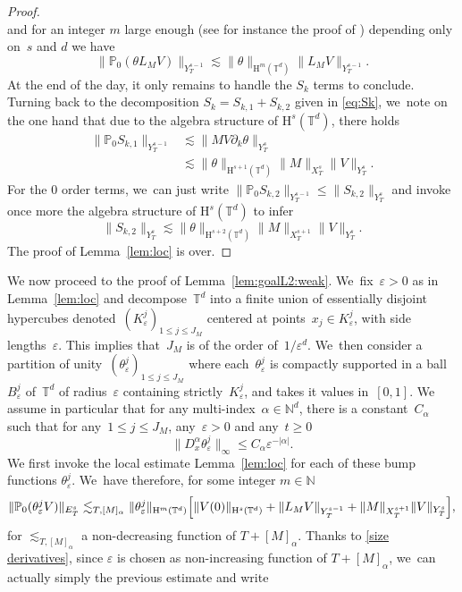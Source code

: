 \documentclass[JEP,XML,SOM,Unicode,published]{cedram}
\theoremstyle{definition}
\newcommand\N{\mathbb{N}}
\newcommand\T{\mathbb{T}}
\renewcommand\H{\mathrm{H}}
\let\ep\varepsilon
\begin{document}
\begin{proof}
\[\]
and for an integer $m$ large enough (see for instance the proof of \cite[Th.\,1.62]{BCD}) depending only on~$s$ and $d$ we have
\[
\|\mathbb{P}_0(\theta L_M V)\|_{Y_T^{s-1}} \lesssim \|\theta\|_{\H^{m}(\T^d)} \|L_M V\|_{Y_T^{s-1}}.
\]
At the end of the day, it only remains to handle the $S_k$ terms to conclude. Turning back to the decomposition $S_k = S_{k,1}+S_{k,2}$ given in \eqref{eq:Sk}, we~note on the one hand that due to the algebra structure of $\H^s(\T^d)$, there holds
\begin{align*}
\|\mathbb{P}_0S_{k,1}\|_{Y_T^{s-1}} &\lesssim \|MV \partial_k\theta\|_{Y_T^s} \\
&\lesssim \|\theta\|_{\H^{s+1}(\T^d)} \|M\|_{X_T^{s}} \|V\|_{Y_T^s}.
\end{align*}
For the $0$ order terms, we~can just write $\|\mathbb{P}_0S_{k,2}\|_{Y_T^{s-1}} \leq \|S_{k,2}\|_{Y_T^s}$ and invoke once more the algebra structure of $\H^s(\T^d)$ to infer
\[
\|S_{k,2}\|_{Y_T^s} \lesssim \|\theta\|_{\H^{s+2}(\T^d)}\|M\|_{X_T^{s+1}} \|V\|_{Y_T^s}.
\]
The proof of Lemma~\ref{lem:loc} is over.
\end{proof}
We now proceed to the proof of Lemma~\ref{lem:goalL2:weak}. We~fix~$\ep>0$ as in Lemma~\ref{lem:loc} and decompose~$\T^d $ into a finite union of essentially disjoint hypercubes denoted~$(K^{j}_\ep)_{1 \leq j \leq J_M} $ centered at points~$ x_j \in K^j_\ep $, with side lengths~$\ep$. This implies that~$J_M$ is of the order of~$1/\ep^d$. We~then consider a partition of unity~$(\theta^{j}_\ep)_{1 \leq j \leq J_M} $ where each~$\theta^{j}_\ep $ is compactly supported in a ball~$B^{j}_\ep$ of~$\T^d$ of radius~$\ep$ containing strictly~$K^j_\ep $, and takes it values in~$[0,1]$.
We assume in particular that for any multi-index~$\alpha \in \N^d$, there is a constant~$C_\alpha$ such that for any~$1 \leq j \leq J_M$, any~$\ep>0$ and any~$t \geq 0$
\begin{equation}\label{size derivatives}
\| D_x^\alpha\theta^{j}_\ep\|_{\infty } \leq C_\alpha{\ep^{-|\alpha|}}.
\end{equation}
We first invoke the local estimate Lemma~\ref{lem:loc} for each of these bump functions $\theta_{\ep}^j$. We~have therefore, for some integer $m\in\N$
\[
\| \mathbb{P}_0(\theta_\ep^j V)\|_{E_T^s} \lesssim_{T,[M]_\alpha} \|\theta_\ep^j \|_{\H^m(\T^d)} \Bigl[\|V(0)\|_{\H^s(\T^d)} + \|L_M V\|_{Y_T^{s-1}} + \|M\|_{X_T^{s+1}}\|V\|_{Y_T^s}\Bigr],
\]
for $\lesssim_{T,[M]_\alpha}$ a non-decreasing function of $T+[M]_\alpha$. Thanks to \eqref{size derivatives}, since $\ep$ is chosen as non-increasing function of $T+[M]_\alpha$, we~can actually simply the previous estimate and write
\end{document}
